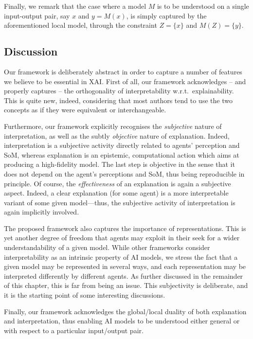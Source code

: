 \documentclass[12pt,a4paper,openright,twoside]{book}
\begin{document}
Finally, we remark that the case where a model $M$ is to be understood on a single input-output pair, say $x$ and $y = M(x)$, is simply captured by the aforementioned local model, through the constraint $Z = \{ x \}$ and $M(Z) = \{ y \}$.

\subsection{Discussion}

Our framework is deliberately abstract in order to capture a number of features we believe to be essential in XAI.
%
First of all, our framework acknowledges -- and properly captures -- the orthogonality of interpretability w.r.t.\ explainability.
%
This is quite new, indeed, considering that most authors tend to use the two concepts as if they were equivalent or interchangeable.

Furthermore, our framework explicitly recognises the \emph{subjective} nature of interpretation, as well as the subtly \emph{objective} nature of explanation.
%
Indeed, interpretation is a subjective activity directly related to agents' perception and SoM, whereas explanation is an epistemic, computational action which aims at producing a high-fidelity model.
%
The last step is objective in the sense that it does not depend on the agent's perceptions and SoM, thus being reproducible in principle.
%
Of course, the \emph{effectiveness} of an explanation is again a subjective aspect.
%
Indeed, a clear explanation (for some agent) is a more interpretable variant of some given model---thus, the subjective activity of interpretation is again implicitly involved.

The proposed framework also captures the importance of representations.
%
This is yet another degree of freedom that agents may exploit in their seek for a wider understandability of a given model.
%
While other frameworks consider interpretability as an intrinsic property of AI models, we stress the fact that a given model may be represented in several ways, and each representation may be interpreted differently by different agents.
%
As further discussed in the remainder of this chapter, this is far from being an issue.
%
This subjectivity is deliberate, and it is the starting point of some interesting discussions.

Finally, our framework acknowledges the global/local duality of both explanation and interpretation, thus enabling AI models to be understood either general or with respect to a particular input/output pair.
\end{document}

